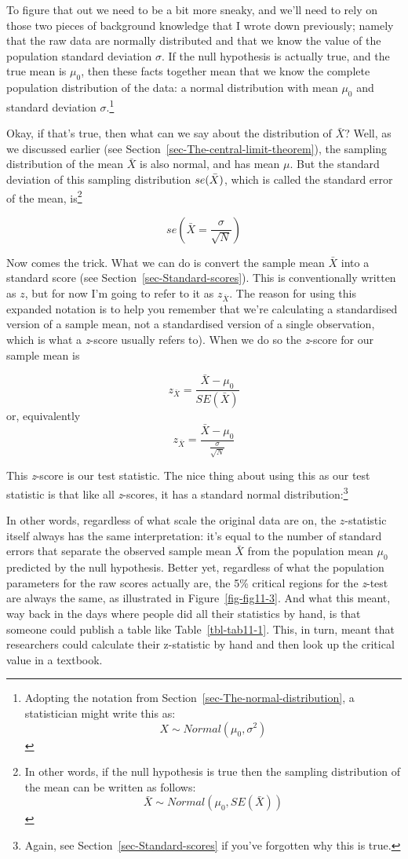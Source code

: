\documentclass[
  a4paper,
]{book}
\begin{document}
To figure that out we need to be a bit more sneaky, and we'll need to
rely on those two pieces of background knowledge that I wrote down
previously; namely that the raw data are normally distributed and that
we know the value of the population standard deviation \(\sigma\). If
the null hypothesis is actually true, and the true mean is \(\mu_0\),
then these facts together mean that we know the complete population
distribution of the data: a normal distribution with mean \(\mu_0\) and
standard deviation \(\sigma\).\footnote{Adopting the notation from
  Section~\ref{sec-The-normal-distribution}, a statistician might write
  this as: \[X \sim Normal(\mu_0,\sigma^2)\]}

Okay, if that's true, then what can we say about the distribution of
\(\bar{X}\)? Well, as we discussed earlier (see
Section~\ref{sec-The-central-limit-theorem}), the sampling distribution
of the mean \(\bar{X}\) is also normal, and has mean \(\mu\). But the
standard deviation of this sampling distribution \(\\{se(\bar{X})\\}\),
which is called the standard error of the mean, is\footnote{In other
  words, if the null hypothesis is true then the sampling distribution
  of the mean can be written as follows:
  \[\bar{X} \sim Normal(\mu_0,SE(\bar{X})) \]}

\[se(\bar{X}=\frac{\sigma}{\sqrt{N}})\]

Now comes the trick. What we can do is convert the sample mean
\(\bar{X}\) into a standard score (see
Section~\ref{sec-Standard-scores}). This is conventionally written as
\(z\), but for now I'm going to refer to it as \(z_{\bar{X}}\). The
reason for using this expanded notation is to help you remember that
we're calculating a standardised version of a sample mean, not a
standardised version of a single observation, which is what a
\emph{z}-score usually refers to). When we do so the \emph{z}-score for
our sample mean is

\[z_{\bar{X}}=\frac{\bar{X}-\mu_0}{SE(\bar{X})}\] or, equivalently
\[z_{\bar{X}}=\frac{\bar{X}-\mu_0}{\frac{\sigma}{\sqrt{N}}}\]

This \emph{z}-score is our test statistic. The nice thing about using
this as our test statistic is that like all \emph{z}-scores, it has a
standard normal distribution:\footnote{Again, see
  Section~\ref{sec-Standard-scores} if you've forgotten why this is
  true.}

In other words, regardless of what scale the original data are on, the
\(z\)-statistic itself always has the same interpretation: it's equal to
the number of standard errors that separate the observed sample mean
\(\bar{X}\) from the population mean \(\mu_0\) predicted by the null
hypothesis. Better yet, regardless of what the population parameters for
the raw scores actually are, the 5\% critical regions for the
\emph{z}-test are always the same, as illustrated in
Figure~\ref{fig-fig11-3}. And what this meant, way back in the days
where people did all their statistics by hand, is that someone could
publish a table like Table~\ref{tbl-tab11-1}. This, in turn, meant that
researchers could calculate their z-statistic by hand and then look up
the critical value in a textbook.
\end{document}

